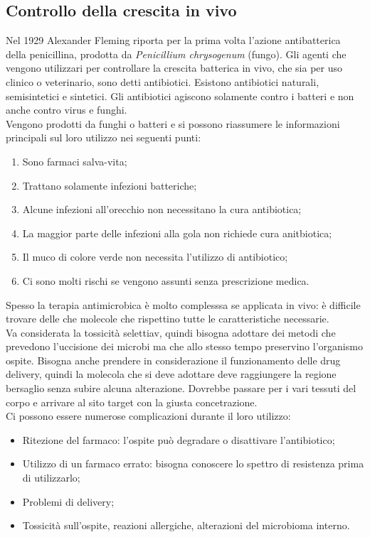 \subsection{Controllo della crescita in vivo}
Nel 1929 Alexander Fleming riporta per la prima volta l'azione antibatterica della penicillina, prodotta da \textit{Penicillium chrysogenum} (fungo). Gli agenti che vengono utilizzari per controllare la crescita batterica in vivo, che sia per uso clinico o veterinario, sono detti antibiotici. Esistono antibiotici naturali, semisintetici e sintetici. Gli antibiotici agiscono solamente contro i batteri e non anche contro virus e funghi. 
\\Vengono prodotti da funghi o batteri e si possono riassumere le informazioni principali sul loro utilizzo nei seguenti punti:
\begin{enumerate}
    \item Sono farmaci salva-vita;
    \item Trattano solamente infezioni batteriche; 
    \item Alcune infezioni all'orecchio non necessitano la cura antibiotica; 
    \item La maggior parte delle infezioni alla gola non richiede cura anitbiotica;
    \item Il muco di colore verde non necessita l'utilizzo di antibiotico; 
    \item Ci sono molti rischi se vengono assunti senza prescrizione medica.
\end{enumerate}
Spesso la terapia antimicrobica è molto complesssa se applicata in vivo: è difficile trovare delle che molecole che rispettino tutte le caratteristiche necessarie. 
\\Va considerata la tossicità selettiav, quindi bisogna adottare dei metodi che prevedono l'uccisione dei microbi ma che allo stesso tempo preservino l'organismo ospite. Bisogna anche prendere in considerazione il funzionamento delle drug delivery, quindi la molecola che si deve adottare deve raggiungere la regione bersaglio senza subire alcuna alterazione. Dovrebbe passare per i vari tessuti del corpo e arrivare al sito target con la giusta concetrazione. 
\\Ci possono essere numerose complicazioni durante il loro utilizzo:
\begin{itemize}
    \item Ritezione del farmaco: l'ospite può degradare o disattivare l'antibiotico; 
    \item Utilizzo di un farmaco errato: bisogna conoscere lo spettro di resistenza prima di utilizzarlo; 
    \item Problemi di delivery; 
    \item Tossicità sull'ospite, reazioni allergiche, alterazioni del microbioma interno.
\end{itemize}
